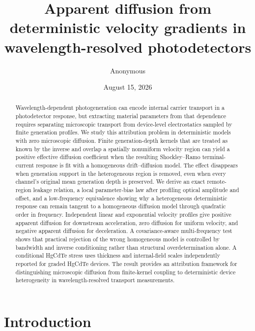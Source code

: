 \documentclass[aps,pra,twocolumn,superscriptaddress,nofootinbib]{revtex4-2}
\begin{document}
\title{Apparent diffusion from deterministic velocity gradients in wavelength-resolved photodetectors}

\author{Anonymous}

\date{August 15, 2026}

\begin{abstract}
Wavelength-dependent photogeneration can encode internal carrier transport in a photodetector response, but extracting material parameters from that dependence requires separating microscopic transport from device-level electrostatics sampled by finite generation profiles. We study this attribution problem in deterministic models with zero microscopic diffusion. Finite generation-depth kernels that are treated as known by the inverse and overlap a spatially nonuniform velocity region can yield a positive effective diffusion coefficient when the resulting Shockley--Ramo terminal-current response is fit with a homogeneous drift--diffusion model. The effect disappears when generation support in the heterogeneous region is removed, even when every channel's original mean generation depth is preserved. We derive an exact remote-region leakage relation, a local parameter-bias law after profiling optical amplitude and offset, and a low-frequency equivalence showing why a heterogeneous deterministic response can remain tangent to a homogeneous diffusion model through quadratic order in frequency. Independent linear and exponential velocity profiles give positive apparent diffusion for downstream acceleration, zero diffusion for uniform velocity, and negative apparent diffusion for deceleration. A covariance-aware multi-frequency test shows that practical rejection of the wrong homogeneous model is controlled by bandwidth and inverse conditioning rather than structural overdetermination alone. A conditional HgCdTe stress uses thickness and internal-field scales independently reported for graded HgCdTe devices. The result provides an attribution framework for distinguishing microscopic diffusion from finite-kernel coupling to deterministic device heterogeneity in wavelength-resolved transport measurements.
\end{abstract}

\maketitle

\section{Introduction}
\end{document}

